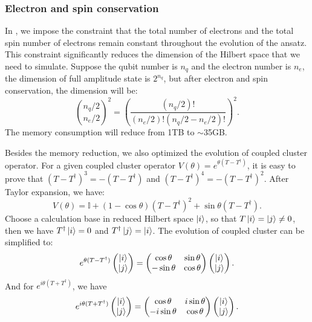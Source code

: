 \subsubsection{Electron and spin conservation}
In \QuPack, we impose the constraint that the total number of electrons and the total spin number of electrons remain constant throughout the evolution of the ansatz. This constraint significantly reduces the dimension of the Hilbert space that we need to simulate. Suppose the qubit number is $n_q$ and the electron number is $n_e$, the dimension of full amplitude state is $2^{n_q}$, but after electron and spin conservation, the dimension will be:
\begin{equation}
    \binom{n_q/2}{n_e/2}^2=\left(\frac{(n_q/2)!}{(n_e/2)!(n_q/2-n_e/2)!}\right)^2.
\end{equation}
The memory consumption will reduce from 1TB to $\sim$35GB.

Besides the memory reduction, we also optimized the evolution of coupled cluster operator. For a given coupled cluster operator $V(\theta)=e^{\theta(T-T^\dagger)}$, it is easy to prove that $(T-T^\dagger)^3 = - (T-T^\dagger)$ and $(T-T^\dagger)^4 = -(T-T^\dagger)^2$. After Taylor expansion, we have:
\begin{equation}
    V(\theta) = \mathbb{I} + ( 1-\cos\theta)(T-T^\dagger)^2 + \sin\theta (T-T^\dagger).
\end{equation}
Choose a calculation base in reduced Hilbert space $\ket{i}$, so that $T\ket{i} = \ket{j}\neq0$, then we have $T^\dagger\ket{i}=0$ and $T^\dagger\ket{j}=\ket{i}$. The evolution of coupled cluster can be simplified to:
\begin{equation}
    e^{\theta(T-T^\dagger)}\begin{pmatrix}
        \ket{i} \\\ket{j}
    \end{pmatrix}=\begin{pmatrix}
        \cos\theta  & \sin\theta \\
        -\sin\theta & \cos\theta
    \end{pmatrix}\begin{pmatrix}
        \ket{i} \\\ket{j}
    \end{pmatrix}.
\end{equation}
And for $e^{i\theta(T+T^\dagger)}$, we have
\begin{equation}
    e^{i\theta(T+T^\dagger)}\begin{pmatrix}
        \ket{i} \\\ket{j}
    \end{pmatrix}=\begin{pmatrix}
        \cos\theta   & i\sin\theta \\
        -i\sin\theta & \cos\theta
    \end{pmatrix}\begin{pmatrix}
        \ket{i} \\\ket{j}
    \end{pmatrix}.
\end{equation}

